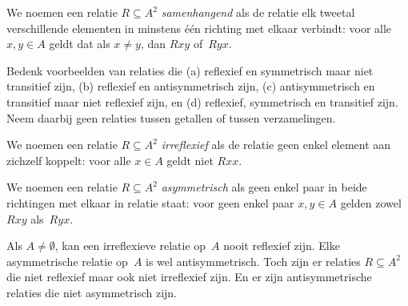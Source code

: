 \documentclass[openany]{memoir}
\begin{document}
\begin{defn}[Samenhangendheid]
We noemen een relatie $R \subseteq A^2$ \emph{samenhangend} als de
relatie elk tweetal verschillende elementen in minstens één richting
met elkaar verbindt: voor alle $x,y\in A$ geldt dat als $x \neq y$,
dan $Rxy$ of~$Ryx$.
\end{defn}

\begin{prob}
Bedenk voorbeelden van relaties die (a) reflexief en symmetrisch maar
niet transitief zijn, (b) reflexief en antisymmetrisch zijn, (c)
antisymmetrisch en transitief maar niet reflexief zijn, en (d)
reflexief, symmetrisch en transitief zijn. Neem daarbij geen relaties
tussen getallen of tussen verzamelingen.
\end{prob} 
 
\begin{defn}[Irreflexiviteit]
We noemen een relatie $R \subseteq A^2$ \emph{irreflexief} als de
relatie geen enkel element aan zichzelf koppelt: voor alle
$x \in A$ geldt niet $Rxx$.
\end{defn}

\begin{defn}[Asymmetrie]
We noemen een relatie $R \subseteq A^2$ \emph{asymmetrisch} als geen
enkel paar in beide richtingen met elkaar in relatie staat: voor geen
enkel paar $x,y\in A$ gelden zowel $Rxy$ als~$Ryx$.
\end{defn}

Als $A \neq \emptyset$, kan een irreflexieve relatie op~$A$ nooit
reflexief zijn. Elke asymmetrische relatie op~$A$ is wel
antisymmetrisch. Toch zijn er relaties $R \subseteq A^2$ die niet
reflexief maar ook niet irreflexief zijn. En er zijn antisymmetrische
relaties die niet asymmetrisch zijn.
\endgroup

\begingroup
\def\olfilename{OLP-0015}
\def\olfilepath{content/sets-functions-relations/relations/}
\hypertarget{unit-OLP-0015}{}



\end{document}
